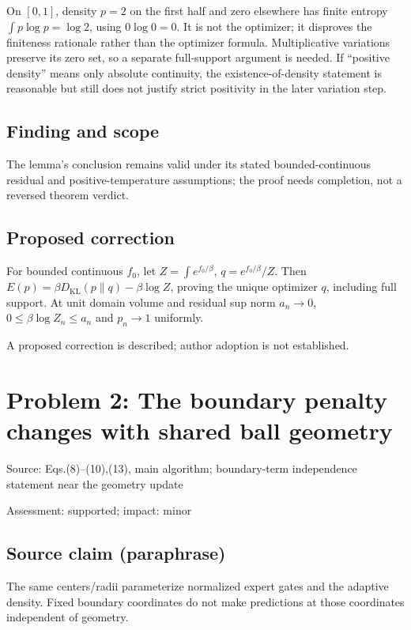 \documentclass[11pt]{article}
\begin{document}
On \([0,1]\), density \(p=2\) on the first half and zero elsewhere has finite entropy \(\int p\log p=\log2\), using \(0\log0=0\). It is not the optimizer; it disproves the finiteness rationale rather than the optimizer formula. Multiplicative variations preserve its zero set, so a separate full-support argument is needed. If “positive density” means only absolute continuity, the existence-of-density statement is reasonable but still does not justify strict positivity in the later variation step.

\subsection*{Finding and scope}

The lemma’s conclusion remains valid under its stated bounded-continuous residual and positive-temperature assumptions; the proof needs completion, not a reversed theorem verdict.

\subsection*{Proposed correction}

For bounded continuous \(f_0\), let \(Z=\int e^{f_0/\beta}\), \(q=e^{f_0/\beta}/Z\). Then \(E(p)=\beta D_{\mathrm{KL}}(p\|q)-\beta\log Z\), proving the unique optimizer \(q\), including full support. At unit domain volume and residual sup norm \(a_n\to0\), \(0\le\beta\log Z_n\le a_n\) and \(p_n\to1\) uniformly.

A proposed correction is described; author adoption is not established.

\section*{Problem 2: The boundary penalty changes with shared ball geometry}

Source: Eqs.(8)–(10),(13), main algorithm; boundary-term independence statement near the geometry update

Assessment: supported; impact: minor

\subsection*{Source claim (paraphrase)}

The same centers/radii parameterize normalized expert gates and the adaptive density. Fixed boundary coordinates do not make predictions at those coordinates independent of geometry.
\end{document}
